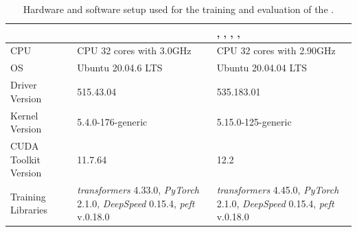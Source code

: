 \begin{table}[H]
    \caption{Hardware and software setup used for the training and evaluation of the \ourmethodshort{}.}
    \centering 
    \footnotesize
    \renewcommand{\arraystretch}{0.5}
    \begin{tabularx}{0.99\textwidth}{M|x|x}
    \toprule
    & 
    \bfseries \gpt{} & 
    \bfseries \llamaTwoSmall{}, \llamaTwoBig{}, \qwenSmall{}, \qwenMedium{}, \qwenLarge{} \\
    \midrule
    CPU & CPU 32 cores with 3.0GHz & CPU 32 cores with 2.90GHz \\ 
    \midrule
    OS & Ubuntu 20.04.6 LTS & Ubuntu 20.04.04 LTS \\
    \midrule
    Driver Version & 515.43.04 & 535.183.01 \\
    \midrule
    Kernel Version & 5.4.0-176-generic & 5.15.0-125-generic \\
    \midrule
    CUDA Toolkit Version & 11.7.64 & 12.2 \\
    \midrule
    Training Libraries & \textit{transformers} 4.33.0,  \textit{PyTorch} 2.1.0, \textit{DeepSpeed} 0.15.4, \textit{peft} v.0.18.0 & \textit{transformers} 4.45.0,  \textit{PyTorch} 2.1.0, \textit{DeepSpeed} 0.15.4, \textit{peft} v.0.18.0 \\
    \bottomrule
\end{tabularx}
\label{tab:hardware}
\end{table}
